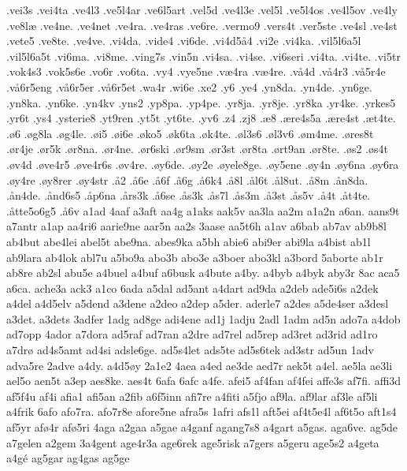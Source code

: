 {.vei3s
.vei4ta
.ve4l3
.ve5l4ar
.ve6l5art
.vel5d
.ve4l3e
.vel5l
.ve5l4os
.ve4l5ov
.ve4ly
.ve8l^^e6
.ve4ne.
.ve4net
.ve4ra.
.ve4ras
.ve6re.
.vermo9
.vers4t
.ver5ste
.ve4sl
.ve4st
.vete5
.ve8te.
.ve4ve.
.vi4da.
.vide4
.vi6de.
.vi4d5^^e54
.vi2e
.vi4ka.
.vil5l6a5l  
.vil5l6a5t
.vi6ma.
.vi8me.
.ving7s
.vin5n
.vi4sa.
.vi4se.
.vi6seri
.vi4ta.
.vi4te.
.vi5tr
.vok4s3
.vok5s6e
.vo6r
.vo6ta.
.vy4
.vye5ne
.v^^e64ra
.v^^e64re.
.v^^e54d
.v^^e54r3
.v^^e55r4e
.v^^e56r5eng
.v^^e56r5er
.v^^e56r5et
.wa4r
.wi6e
.xe2
.y6
.ye4
.yn8da.
.yn4de.
.yn6ge.
.yn8ka.
.yn6ke.
.yn4kv
.yns2
.yp8pa.
.yp4pe.
.yr8ja.
.yr8je.
.yr8ka
.yr4ke.
.yrkes5
.yr6t
.ys4
.ysterie8
.yt9ren
.yt5t
.yt6te.
.yv6
.z4
.zj8
.^^e68
.^^e6re4s5a
.^^e6re4st
.^^e6t4te.
.^^f86
.^^f8g8la
.^^f8g4le.
.^^f8i5
.^^f8i6e
.^^f8ko5
.^^f8k6ta
.^^f8k4te.
.^^f8l3s6
.^^f8l3v6
.^^f8m4me.
.^^f8res8t
.^^f8r4je
.^^f8r5k
.^^f8r8na.
.^^f8r4ne.
.^^f8r6ski
.^^f8r9sm
.^^f8r3st
.^^f8r8ta
.^^f8rt9an
.^^f8r8te.
.^^f8s2
.^^f8s4t
.^^f8v4d
.^^f8ve4r5
.^^f8ve4r6s
.^^f8v4re.
.^^f8y6de.
.^^f8y2e
.^^f8yele8ge.
.^^f8y5ene
.^^f8y4n
.^^f8y6na
.^^f8y6ra
.^^f8y4re
.^^f8y8rer
.^^f8y4str
.^^e52
.^^e56e
.^^e56f
.^^e56g
.^^e56k4
.^^e58l
.^^e5l6t
.^^e5l8ut.
.^^e58m
.^^e5n8da.
.^^e5n4de.
.^^e5nd6s5
.^^e5p6na
.^^e5rs3k
.^^e56se
.^^e5s3k
.^^e5s7l
.^^e5s3m
.^^e53st
.^^e5s5v
.^^e54t
.^^e5t4te.
.^^e5tte5o6g5
.^^e56v
a1ad
4aaf
a3aft
aa4g
a1aks
aak5v
aa3la
aa2m
a1a2n
a6an.
aans9t
a7antr
a1ap
aa4ri6
aarie9ne
aar5n
aa2s
3aase
aa5t6h
a1av
a6bab
ab7av
ab9b8l
ab4but
abe4lei
abel5t
abe9na.
abes9ka
a5bh
abie6
abi9er
abi9la
a4bist
ab1l
ab9lara
ab4lok
abl7u
a5bo9a
abo3b
abo3e
a3boer
abo3kl
a3bord
5aborte
ab1r
ab8re
ab2sl
abu5e
a4buel
a4buf
a6busk
a4bute
a4by.
a4byb
a4byk
aby3r
8ac
aca5
a6ca.
ache3a
ack3
a1co
6ada
a5dal
ad5ant
a4dart
ad9da
a2deb
ade5i6s
a2dek
a4del
a4d5elv
a5dend
a3dene
a2deo
a2dep
a5der.
aderle7
a2des
a5de4ser
a3desl
a3det.
a3dets
3adfer
1adg
ad8ge
adi4ene
ad1j
1adju
2adl
1adm
ad5n
ado7a
a4dob
ad7opp
4ador
a7dora
ad5raf
ad7ran
a2dre
ad7rel
ad5rep
ad3ret
ad3rid
ad1ro
a7dr^^f8
ad4s5amt
ad4si
adsle6ge.
ad5s4let
ads5te
ad5s6tek
ad3str
ad5un
1adv
adva5re
2adve
a4dy.
a4d5^^f8y
2a1e2
4aea
a4ed
ae3de
aed7r
aek5t
a4el.
ae5la
ae3li
ael5o
aen5t
a3ep
aes8ke.
aes4t
6afa
6afc
a4fe.
afei5
af4fan
af4fei
affe3s
af7fi.
affi3d
af5f4u
af4i
afia1
afi5an
a2fib
a6f5inn
afi7re
a4fiti
a5fjo
af9la.
af9lar
af3le
af5li
a4frik
6afo
afo7ra.
afo7r8e
afore5ne
afra5s
1afri
afs1l
aft5ei
af4t5e4l
af6t5o
aft1s4
af5yr
af^^f84r
af^^f85ri
4aga
a2gaa
a5gae
a4ganf
agang7s8
a4gart
a5gas.
aga6ve.
ag5de
a7gelen
a2gem
3a4gent
age4r3a
age6rek
age5risk
a7gers
a5geru
age5s2
a4geta
a4g^^e9
ag5gar
ag4gas
ag5ge
}
